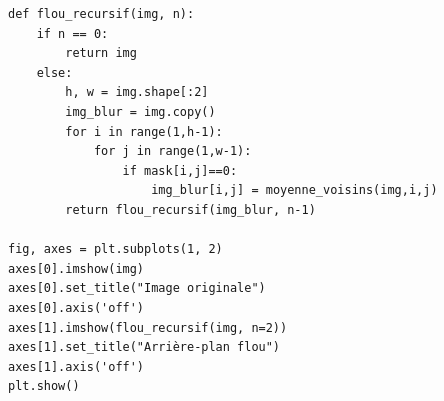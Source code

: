 \reponse{}

\begin{verbatim}
def flou_recursif(img, n):
    if n == 0:
        return img
    else:
        h, w = img.shape[:2]
        img_blur = img.copy()
        for i in range(1,h-1):
            for j in range(1,w-1):
                if mask[i,j]==0:
                    img_blur[i,j] = moyenne_voisins(img,i,j)
        return flou_recursif(img_blur, n-1)

fig, axes = plt.subplots(1, 2)
axes[0].imshow(img)
axes[0].set_title("Image originale")
axes[0].axis('off')
axes[1].imshow(flou_recursif(img, n=2))
axes[1].set_title("Arrière-plan flou")
axes[1].axis('off')
plt.show()
\end{verbatim}


